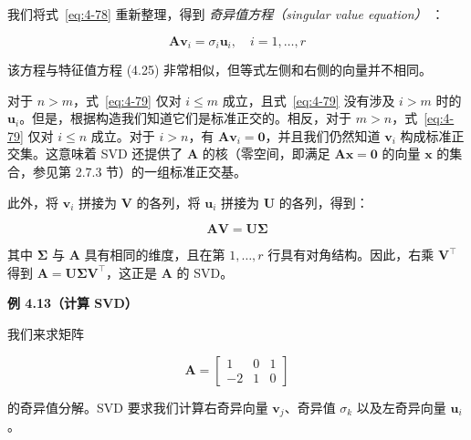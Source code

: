 我们将式~\eqref{eq:4-78} 重新整理，得到 \emph{奇异值方程（singular value equation）} ：

\begin{equation}
\boldsymbol{A} \boldsymbol{v}_i = \sigma_i \boldsymbol{u}_i, \quad i = 1, \ldots, r
\tag{4.79}\label{eq:4-79}
\end{equation}

该方程与特征值方程 (4.25) 非常相似，但等式左侧和右侧的向量并不相同。

对于 $ n > m $，式~\eqref{eq:4-79} 仅对 $ i \le m $ 成立，且式~\eqref{eq:4-79} 没有涉及 $ i > m $ 时的 $ \boldsymbol{u}_i $。但是，根据构造我们知道它们是标准正交的。相反，对于 $ m > n $，式~\eqref{eq:4-79} 仅对 $ i \le n $ 成立。对于 $ i > n $，有 $ \boldsymbol{A} \boldsymbol{v}_i = \boldsymbol{0} $，并且我们仍然知道 $ \boldsymbol{v}_i $ 构成标准正交集。这意味着 SVD 还提供了 $ \boldsymbol{A} $ 的核（零空间，即满足 $ \boldsymbol{A} \boldsymbol{x} = \boldsymbol{0} $ 的向量 $ \boldsymbol{x} $ 的集合，参见第 2.7.3 节）的一组标准正交基。

此外，将 $ \boldsymbol{v}_i $ 拼接为 $ \boldsymbol{V} $ 的各列，将 $ \boldsymbol{u}_i $ 拼接为 $ \boldsymbol{U} $ 的各列，得到：

\begin{equation}
\boldsymbol{A} \boldsymbol{V} = \boldsymbol{U} \boldsymbol{\Sigma}
\tag{4.80}\label{eq:4-80}
\end{equation}

其中 $ \boldsymbol{\Sigma} $ 与 $ \boldsymbol{A} $ 具有相同的维度，且在第 $ 1, \ldots, r $ 行具有对角结构。因此，右乘 $ \boldsymbol{V}^\top $ 得到 $ \boldsymbol{A} = \boldsymbol{U} \boldsymbol{\Sigma} \boldsymbol{V}^\top $，这正是 $ \boldsymbol{A} $ 的 SVD。

\begin{notebox}
\textbf{例 4.13（计算 SVD）}
\end{notebox}

\begin{notebox}
我们来求矩阵

\begin{equation}
\boldsymbol{A} = \begin{bmatrix} 1 & 0 & 1 \\ -2 & 1 & 0 \end{bmatrix}
\tag{4.81}\label{eq:4-81}
\end{equation}

的奇异值分解。SVD 要求我们计算右奇异向量 $ \boldsymbol{v}_j $、奇异值 $ \sigma_k $ 以及左奇异向量 $ \boldsymbol{u}_i $。
\end{notebox}

